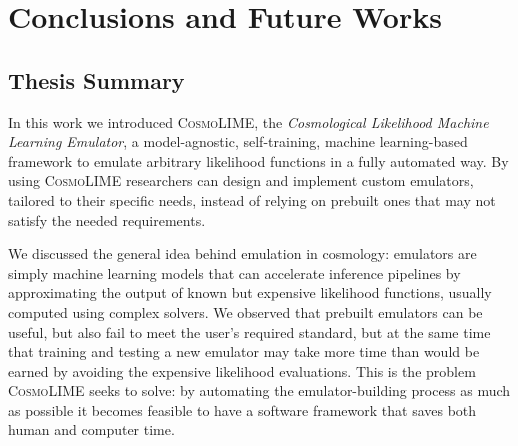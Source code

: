 \chapter{Conclusions and Future Works}
\begin{comment}
funzioni mancanti tipo test statistici generali ad es contour calcolati automaticamente; vedi lista su keep

Esempi più complicati, ad es renderlo competitivo con cosmopower et similia sfidandoli sullo stesso dataset

sfida principale provare a rifare da zero in modo automatizzato ad esempio cosmopower; lo scopo di questo nuovo paradigma, di questo nuovo approccio all'emulazione è di renderla più accessibile in quanto fai da te, e dimostrare che questa cosa sia fattibile e funzioni in contesti non banali è la vera sfida di cosmolime

nel futuro pubblicarlo? non so se si possa menzionare

completare la parallelizzazione distribuendo i modelli su più processi/pc? Può tornare utile perché come abbiamo visto nell'esempio delle supernove con RF anche in casi di requisiti non particolarmente assurdi (1000 output) aumentare la complessità del modello può aumentare esponenzialmente le risorse necessarie

RICORDATI DI FARE I PLOT TIKZ NECESSARI IN GIRO PER IL PAPER E MAGARI DI AGGIUNGERE SOMMARI PER CODICI E FIGURE! 
mettere qualche pagebreak in corrispondenza di codici o tabelle? Ma solo nella versione finale
\end{comment}

\section{Thesis Summary}
In this work we introduced \textsc{CosmoLIME}, the \emph{Cosmological Likelihood Machine Learning Emulator}, a model-agnostic, self-training, machine learning-based framework to emulate arbitrary likelihood functions in a fully automated way. By using \textsc{CosmoLIME} researchers can design and implement custom emulators, tailored to their specific needs, instead of relying on prebuilt ones that may not satisfy the needed requirements.

We discussed the general idea behind emulation in cosmology: emulators are simply machine learning models that can accelerate inference pipelines by approximating the output of known but expensive likelihood functions, usually computed using complex solvers. We observed that prebuilt emulators can be useful, but also fail to meet the user's required standard, but at the same time that training and testing a new emulator may take more time than would be earned by avoiding the expensive likelihood evaluations. This is the problem \textsc{CosmoLIME} seeks to solve: by automating the emulator-building process as much as possible it becomes feasible to have a software framework that saves both human and computer time.

